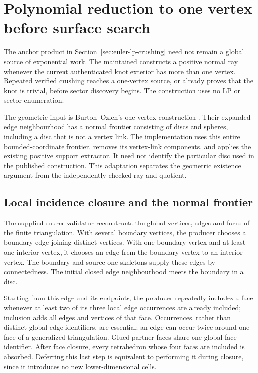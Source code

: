 \section{Polynomial reduction to one vertex before surface search}
\label{sec:vertex-reduction}

The anchor product in Section~\ref{sec:euler-lp-crushing} need not remain
a global source of exponential work.  The maintained
 constructs a positive
normal ray whenever the current authenticated knot exterior has more than
one vertex.  Repeated verified crushing reaches a one-vertex source, or
already proves that the knot is trivial, before sector discovery begins.
The construction uses no LP or sector enumeration.

The geometric input is Burton--Ozlen's one-vertex construction
\cite[Lemma~6]{burton-ozlen}.  Their expanded edge neighbourhood has a normal
frontier consisting of discs and spheres, including a disc that is not a
vertex link.  The implementation uses this entire bounded-coordinate
frontier, removes its vertex-link components, and applies the existing
positive support extractor.  It need not identify the particular disc used
in the published construction.  This adaptation separates the geometric
existence argument from the independently checked ray and quotient.

\subsection{Local incidence closure and the normal frontier}

The supplied-source validator reconstructs the global vertices, edges and
faces of the finite triangulation.  With several boundary vertices, the
producer chooses a boundary edge joining distinct vertices.  With one
boundary vertex and at least one interior vertex, it chooses an edge from
the boundary vertex to an interior vertex.  The boundary and source
one-skeletons supply these edges by connectedness.  The initial closed
edge neighbourhood meets the boundary in a disc.

Starting from this edge and its endpoints, the producer repeatedly includes
a face whenever at least two of its three local edge occurrences are
already included; inclusion adds all edges and vertices of that face.
Occurrences, rather than distinct global edge identifiers, are essential:
an edge can occur twice around one face of a generalized triangulation.
Glued partner faces share one global face identifier.  After face closure,
every tetrahedron whose four faces are included is absorbed.  Deferring
this last step is equivalent to performing it during closure, since it
introduces no new lower-dimensional cells.

